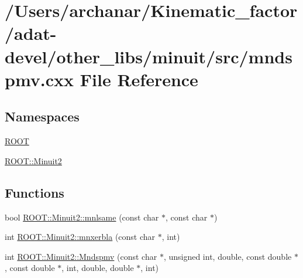 \hypertarget{adat-devel_2other__libs_2minuit_2src_2mndspmv_8cxx}{}\section{/\+Users/archanar/\+Kinematic\+\_\+factor/adat-\/devel/other\+\_\+libs/minuit/src/mndspmv.cxx File Reference}
\label{adat-devel_2other__libs_2minuit_2src_2mndspmv_8cxx}
\subsection*{Namespaces}
\begin{DoxyCompactItemize}
\item 
 \mbox{\hyperlink{namespaceROOT}{R\+O\+OT}}
\item 
 \mbox{\hyperlink{namespaceROOT_1_1Minuit2}{R\+O\+O\+T\+::\+Minuit2}}
\end{DoxyCompactItemize}
\subsection*{Functions}
\begin{DoxyCompactItemize}
\item 
bool \mbox{\hyperlink{namespaceROOT_1_1Minuit2_a3f90b826c2c1b4313f9a90c22b8ee657}{R\+O\+O\+T\+::\+Minuit2\+::mnlsame}} (const char $\ast$, const char $\ast$)
\item 
int \mbox{\hyperlink{namespaceROOT_1_1Minuit2_a6c2d97c42f0b3f75b7370ae5e6f2c638}{R\+O\+O\+T\+::\+Minuit2\+::mnxerbla}} (const char $\ast$, int)
\item 
int \mbox{\hyperlink{namespaceROOT_1_1Minuit2_ad193f5f7fa4c96ebf1fe98c72ab22ca2}{R\+O\+O\+T\+::\+Minuit2\+::\+Mndspmv}} (const char $\ast$, unsigned int, double, const double $\ast$, const double $\ast$, int, double, double $\ast$, int)
\end{DoxyCompactItemize}
